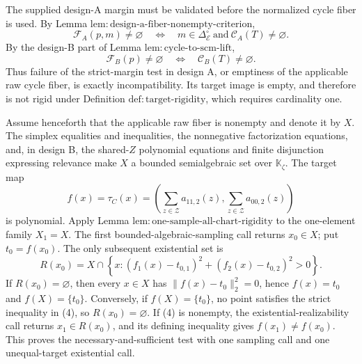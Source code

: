 The supplied design-A margin must be validated before the normalized cycle fiber is used.  By Lemma \(\mathrm{lem{:}design\text{-}a\text{-}fiber\text{-}nonempty\text{-}criterion}\),
\[
 \mathcal F_A(p,m)\ne\varnothing
 \quad\Longleftrightarrow\quad
 m\in\Delta_{\mathcal E}^{\circ}
 \ \text{and}\ 
 \mathcal C_A(T)\ne\varnothing .                         \tag{1}
\]
By the design-B part of Lemma \(\mathrm{lem{:}cycle\text{-}to\text{-}scm\text{-}lift}\),
\[
 \mathcal F_B(p)\ne\varnothing
 \quad\Longleftrightarrow\quad
 \mathcal C_B(T)\ne\varnothing .                         \tag{2}
\]
Thus failure of the strict-margin test in design A, or emptiness of the applicable raw cycle fiber, is exactly incompatibility.  Its target image is empty, and therefore is not rigid under Definition \(\mathrm{def{:}target\text{-}rigidity}\), which requires cardinality one.

Assume henceforth that the applicable raw fiber is nonempty and denote it by \(X\).  The simplex equalities and inequalities, the nonnegative factorization equations, and, in design B, the shared-\(Z\) polynomial equations and finite disjunction expressing relevance make \(X\) a bounded semialgebraic set over \(\mathbb K_{\zeta}\).  The target map
\[
 f(x)=\tau_C(x)
 =\left(\sum_{z\in\mathcal Z}a_{11,2}(z),
          \sum_{z\in\mathcal Z}a_{00,2}(z)\right)        \tag{3}
\]
is polynomial.  Apply Lemma \(\mathrm{lem{:}one\text{-}sample\text{-}all\text{-}chart\text{-}rigidity}\) to the one-element family \(X_1=X\).  The first bounded-algebraic-sampling call returns \(x_0\in X\); put \(t_0=f(x_0)\).  The only subsequent existential set is
\[
 R(x_0)=X\cap
 \left\{x:
   (f_1(x)-t_{0,1})^2+(f_2(x)-t_{0,2})^2>0
 \right\}.                                                \tag{4}
\]
If \(R(x_0)=\varnothing\), then every \(x\in X\) has \(\|f(x)-t_0\|_2^2=0\), hence \(f(x)=t_0\) and \(f(X)=\{t_0\}\).  Conversely, if \(f(X)=\{t_0\}\), no point satisfies the strict inequality in (4), so \(R(x_0)=\varnothing\).  If (4) is nonempty, the existential-realizability call returns \(x_1\in R(x_0)\), and its defining inequality gives \(f(x_1)\ne f(x_0)\).  This proves the necessary-and-sufficient test with one sampling call and one unequal-target existential call.

